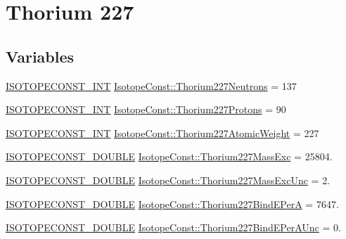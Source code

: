 \hypertarget{group___isotope_const-_thorium-_th227}{}\section{Thorium 227}
\label{group___isotope_const-_thorium-_th227}
\subsection*{Variables}
\begin{DoxyCompactItemize}
\item 
\mbox{\hyperlink{group___isotope_const-_macros_ga5f18360b3e99483a35c32d789e62621c}{I\+S\+O\+T\+O\+P\+E\+C\+O\+N\+S\+T\+\_\+\+I\+NT}} \mbox{\hyperlink{group___isotope_const-_thorium-_th227_gadf149e6ee215e4a9edcf1e8b884cb293}{Isotope\+Const\+::\+Thorium227\+Neutrons}} = 137
\item 
\mbox{\hyperlink{group___isotope_const-_macros_ga5f18360b3e99483a35c32d789e62621c}{I\+S\+O\+T\+O\+P\+E\+C\+O\+N\+S\+T\+\_\+\+I\+NT}} \mbox{\hyperlink{group___isotope_const-_thorium-_th227_ga8ecfc1b5889a275a27b43cdfae209718}{Isotope\+Const\+::\+Thorium227\+Protons}} = 90
\item 
\mbox{\hyperlink{group___isotope_const-_macros_ga5f18360b3e99483a35c32d789e62621c}{I\+S\+O\+T\+O\+P\+E\+C\+O\+N\+S\+T\+\_\+\+I\+NT}} \mbox{\hyperlink{group___isotope_const-_thorium-_th227_ga7a2387d0a7bef1b03ce301c4fc37d037}{Isotope\+Const\+::\+Thorium227\+Atomic\+Weight}} = 227
\item 
\mbox{\hyperlink{group___isotope_const-_macros_ga8f45a7272ce02c0b4c65c44636ed719a}{I\+S\+O\+T\+O\+P\+E\+C\+O\+N\+S\+T\+\_\+\+D\+O\+U\+B\+LE}} \mbox{\hyperlink{group___isotope_const-_thorium-_th227_ga68890a0163f7cb0819dc308816772d20}{Isotope\+Const\+::\+Thorium227\+Mass\+Exc}} = 25804.
\item 
\mbox{\hyperlink{group___isotope_const-_macros_ga8f45a7272ce02c0b4c65c44636ed719a}{I\+S\+O\+T\+O\+P\+E\+C\+O\+N\+S\+T\+\_\+\+D\+O\+U\+B\+LE}} \mbox{\hyperlink{group___isotope_const-_thorium-_th227_gae6104eb9f56eb6620b17868ed125ac12}{Isotope\+Const\+::\+Thorium227\+Mass\+Exc\+Unc}} = 2.
\item 
\mbox{\hyperlink{group___isotope_const-_macros_ga8f45a7272ce02c0b4c65c44636ed719a}{I\+S\+O\+T\+O\+P\+E\+C\+O\+N\+S\+T\+\_\+\+D\+O\+U\+B\+LE}} \mbox{\hyperlink{group___isotope_const-_thorium-_th227_gad0a5d7f6dcbf8f024ee1d65cd8ba14da}{Isotope\+Const\+::\+Thorium227\+Bind\+E\+PerA}} = 7647.
\item 
\mbox{\hyperlink{group___isotope_const-_macros_ga8f45a7272ce02c0b4c65c44636ed719a}{I\+S\+O\+T\+O\+P\+E\+C\+O\+N\+S\+T\+\_\+\+D\+O\+U\+B\+LE}} \mbox{\hyperlink{group___isotope_const-_thorium-_th227_gac4fb0456f770149848bd04f93e6b419b}{Isotope\+Const\+::\+Thorium227\+Bind\+E\+Per\+A\+Unc}} = 0.

\end{DoxyCompactItemize}
